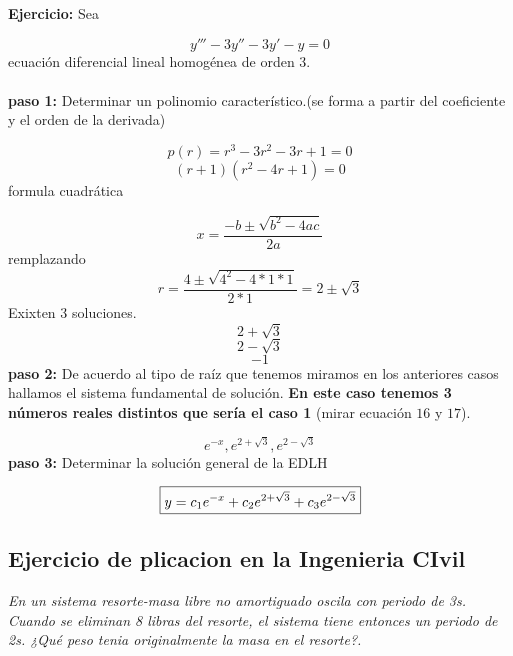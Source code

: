 \documentclass{article}
\begin{document}
\textbf{Ejercicio:}
Sea

\begin{equation}
y'''-3y''-3y'-y=0
\end{equation}
ecuación diferencial lineal homogénea de orden 3.\\\\

\textbf{paso 1:} Determinar un polinomio característico.(se forma a partir del coeficiente y el orden de la derivada)

\begin{equation}
p(r)=r^3-3r^2-3r+1=0
\end{equation}
\begin{equation}
(r+1)(r^2-4r+1)=0
\end{equation}
formula cuadrática

\begin{equation}
x = \frac {-b \pm \sqrt {b^2 - 4ac}}{2a}
\end{equation}
remplazando
\begin{equation}
r = \frac {4 \pm \sqrt {4^2 - 4*1*1}}{2*1}=2 \pm \sqrt {3}
\end{equation}
Exixten 3 soluciones.
\begin{equation}
2+\sqrt{3}
\end{equation}
\begin{equation}
2-\sqrt{3}
\end{equation}
\begin{equation}
-1
\end{equation}
\textbf{paso 2:}   De acuerdo al tipo de raíz que tenemos miramos en los anteriores casos hallamos  el sistema fundamental de solución. \textbf{En este caso tenemos 3 números reales distintos que sería el caso 1  }(mirar ecuación $16$ y $17$).

\begin{equation}
e^{-x},e^{2 + \sqrt {3}},e^{2 - \sqrt {3}}
\end{equation}
\textbf{paso 3:} Determinar la solución general de la EDLH 
\begin{center}
\begin{equation}
$$ \boxed{y =c_1e^{-x}+c_2e^{2 + \sqrt {3}}+c_3e^{2 - \sqrt {3}}}$$
\end{equation}
\end{center}
\subsection{ Ejercicio de plicacion en la Ingenieria CIvil}
\textit{En un sistema resorte-masa libre no amortiguado oscila con periodo de 3s. Cuando se eliminan 8 libras del resorte, el sistema tiene entonces un periodo de 2s. ¿Qué peso tenia originalmente la masa en el resorte?. }\cite{edicion} 
\\
\end{document}
